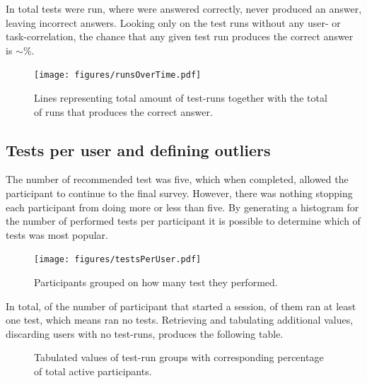 \documentclass[nofilelist,dvipsnames]{cslthse-msc}
\begin{document}
{				In total  tests were run, where
				 were answered correctly,
				 never produced an answer, leaving
				 incorrect answers. Looking only on the test
				runs without any user- or task-correlation, the chance that any given test run
				produces the correct answer is $\sim$\%.

				\begin{figure}[h!]
					\centering
					\texttt{[image: figures/runsOverTime.pdf]}
          \vspace{-0.3cm}
          \caption{Lines representing total amount of test-runs together with
            the total of runs that produces the correct answer.}
          \vspace{-0.4cm}
				\end{figure}

			\subsection{Tests per user and defining outliers}

				The number of recommended test was five, which when completed, allowed
				the participant to continue to the final survey. However, there was
				nothing stopping each participant from doing more or less than five.
        By generating a histogram for the number of performed tests per
        participant it is possible to determine which of tests was most
        popular.

				\begin{figure}[h!]
					\centering
					\texttt{[image: figures/testsPerUser.pdf]}
					\caption{Participants grouped on how many test they performed.}
				\end{figure}

        In total, of the  number of participant that
        started a session,  of them ran at least one
        test, which means  ran no tests. Retrieving and
        tabulating additional values, discarding users with no test-runs,
        produces the following table.

        \begin{figure}[h!]
          \centering
          \caption{%
            Tabulated values of test-run groups with corresponding percentage
            of total active participants.%
          }
        \end{figure}

}
\end{document}
